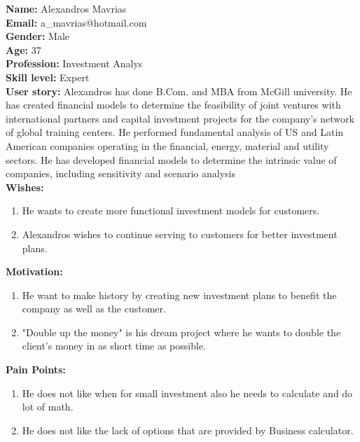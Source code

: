 \documentclass{article}
\begin{document}
\begin{multicols}{2}[]
\noindent
\textbf{Name:} Alexandros Mavrias \\
\newline
\textbf{Email:} a\_mavrias@hotmail.com \\
\newline
\textbf{Gender:} Male \\
\newline
\textbf{Age:} 37 \\
\newline
\textbf{Profession:} Investment Analys \\
\newline
\textbf{Skill level:} Expert \\
\newline
\textbf{User story:} Alexandros has done B.Com. and MBA from McGill university. He has created financial models to determine the feasibility of joint ventures with international partners and capital investment projects for the company’s network of global training centers. He performed fundamental analysis of US and Latin American companies operating in the financial, energy, material and utility sectors. He has developed financial models to determine the intrinsic value of companies, including sensitivity and scenario analysis \\
\columnbreak
\newline
\textbf{Wishes: } 
\begin{enumerate}
    \item He wants to create more functional investment models for customers.
    \item Alexandros wishes to continue serving to customers for better investment plans.
\end{enumerate}
\textbf{Motivation:}
\begin{enumerate}
    \item He want to make history by creating new investment plans to benefit the company as well as the customer.
    \item "Double up the money" is his dream project where he wants to double the client's money in as short time as possible.
\end{enumerate}
\textbf{Pain Points:}
\begin{enumerate}
    \item He does not like when for small investment also he needs to calculate and do lot of math.
    \item He does not like the lack of options that are provided by Business calculator.
\end{enumerate}
\end{multicols}
\end{document}
